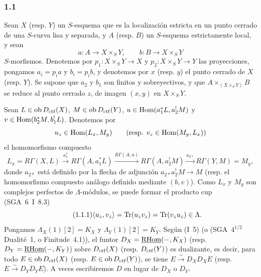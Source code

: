 \subsubsection*{1.1}
Sean $X$ (resp. $Y$) un $S$-esquema que es la localización estricta en un punto cerrado de una $S$-curva lisa y separada, y $A$ (resp. $B$) un $S$-esquema estrictamente local, y sean
\[
a:A\longrightarrow X\times_S Y,
\qquad
b:B\longrightarrow X\times_S Y
\]
$S$-morfismos. Denotemos por $p_1:X\times_S Y\to X$ y $p_2:X\times_S Y\to Y$ las proyecciones, pongamos $a_i=p_i a$ y $b_i=p_i b$, y denotemos por $x$ (resp. $y$) el punto cerrado de $X$ (resp. $Y$). Se supone que $a_2$ y $b_1$ son finitos y sobreyectivos, y que $A\times_{(X\times_S Y)}B$ se reduce al punto cerrado $z$, de imagen $(x,y)$ en $X\times_S Y$.

Sean $L\in \operatorname{ob} D_{\mathrm{ctf}}(X)$, $M\in \operatorname{ob} D_{\mathrm{ctf}}(Y)$, $u\in\operatorname{Hom}(a_1^*L,a_2^!M)$ y $v\in\operatorname{Hom}(b_2^*M,b_1^!L)$. Denotemos por
\[
u_z\in\operatorname{Hom}(L_x,M_y)\qquad (\text{resp. }v_z\in\operatorname{Hom}(M_y,L_x))
\]
el homomorfismo compuesto
\[
L_x=R\Gamma(X,L)\xrightarrow{a_1^*}R\Gamma(A,a_1^*L)
\xrightarrow{R\Gamma(A,u)}R\Gamma(A,a_2^!M)
\xrightarrow{a_{2*}}R\Gamma(Y,M)=M_y,
\]
donde $a_{2*}$ está definido por la flecha de adjunción $a_{2*}a_2^!M\to M$ (resp. el homomorfismo compuesto análogo definido mediante $(b,v)$). Como $L_x$ y $M_y$ son complejos perfectos de $\Lambda$-módulos, se puede formar el producto cup (SGA~6~I~8.3)
\begin{equation}\tag{1.1.1}
\langle u_z,v_z\rangle=\operatorname{Tr}(u_zv_z)=\operatorname{Tr}(v_zu_z)\in\Lambda.
\end{equation}
Pongamos $\Lambda_X(1)[2]=K_X$ y $\Lambda_Y(1)[2]=K_Y$. Según (I~5) (o (SGA~$4^{1/2}$ Dualité~1, o Finitude~4.1)), el funtor $D_X=\underline{\mathrm{RHom}}(-,K_X)$ (resp. $D_Y=\underline{\mathrm{RHom}}(-,K_Y)$) sobre $D_{\mathrm{ctf}}(X)$ (resp. $D_{\mathrm{ctf}}(Y)$) es dualizante, es decir, para todo $E\in\operatorname{ob} D_{\mathrm{ctf}}(X)$ (resp. $E\in\operatorname{ob} D_{\mathrm{ctf}}(Y)$), se tiene $E\xrightarrow{\sim}D_XD_XE$ (resp. $E\xrightarrow{\sim}D_YD_YE$). A veces escribiremos $D$ en lugar de $D_X$ o $D_Y$.

